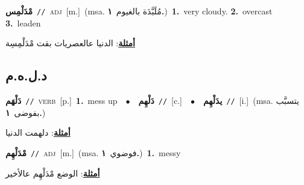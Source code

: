 \documentclass[10pt,a4paper,twoside]{article} %
\begin{document}
\begin{multicols}{2}
{\setlength\topsep{0pt}\textbf{\foreignlanguage{arabic}{مْدَلْمِس}}\ {\color{gray}\texttt{//}\color{black}}\ \textsc{adj}\ [m.]\ \color{gray}(msa. \foreignlanguage{arabic}{مُلَبَّدَة بالغيوم}~\foreignlanguage{arabic}{\textbf{١.}})\color{black}\ \textbf{1.}~very cloudy.  \textbf{2.}~overcast  \textbf{3.}~leaden\  \begin{flushright}\color{gray}\foreignlanguage{arabic}{\textbf{\underline{\foreignlanguage{arabic}{أمثلة}}}: الدنيا عالعصريات بقت مْدَلْمِسِة}\end{flushright}\color{black}} \vspace{2mm}

\vspace{-3mm}
\subsection*{\color{blue}\foreignlanguage{arabic}{د.ل.ه.م}\color{blue}{}} 

{\setlength\topsep{0pt}\textbf{\foreignlanguage{arabic}{دَلْهَم}}\ {\color{gray}\texttt{//}\color{black}}\ \textsc{verb}\ [p.]\ \textbf{1.}~mess up\ \ $\bullet$\ \ \setlength\topsep{0pt}\textbf{\foreignlanguage{arabic}{دَلْهِم}}\ {\color{gray}\texttt{//}\color{black}}\ [c.]\ \ $\bullet$\ \ \setlength\topsep{0pt}\textbf{\foreignlanguage{arabic}{يدَلْهِم}}\ {\color{gray}\texttt{//}\color{black}}\ [i.]\ \color{gray}(msa. \foreignlanguage{arabic}{يتسبَّب بفوضى}~\foreignlanguage{arabic}{\textbf{١.}})\color{black}\  \begin{flushright}\color{gray}\foreignlanguage{arabic}{\textbf{\underline{\foreignlanguage{arabic}{أمثلة}}}: دلهمت الدنيا}\end{flushright}\color{black}} \vspace{2mm}

{\setlength\topsep{0pt}\textbf{\foreignlanguage{arabic}{مْدَلْهِم}}\ {\color{gray}\texttt{//}\color{black}}\ \textsc{adj}\ [m.]\ \color{gray}(msa. \foreignlanguage{arabic}{فوضوي}~\foreignlanguage{arabic}{\textbf{١.}})\color{black}\ \textbf{1.}~messy\  \begin{flushright}\color{gray}\foreignlanguage{arabic}{\textbf{\underline{\foreignlanguage{arabic}{أمثلة}}}: الوضع مْدَلْهِم عالأخير}\end{flushright}\color{black}} \vspace{2mm}


\end{multicols}
\end{document}
